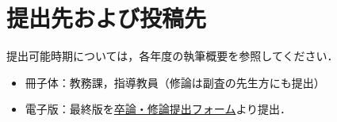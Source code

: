 \chapter{提出先および投稿先}
提出可能時期については，各年度の執筆概要を参照してください．
	\begin{itemize}
		\item 冊子体：教務課，指導教員（修論は副査の先生方にも提出）
		\item 電子版：最終版を\href{https://forms.gle/ZUT2Erq8iPRBpF4q9}{卒論・修論提出フォーム}より提出．
	\end{itemize}